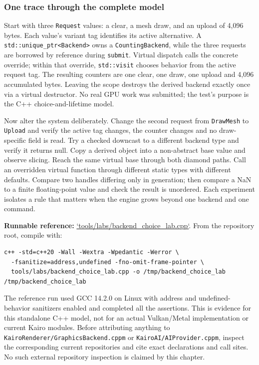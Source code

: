 \subsubsection{One trace through the complete model}\label{one-trace-through-the-complete-model}

Start with three \texttt{Request} values: a clear, a mesh draw, and an upload of 4,096 bytes. Each value's variant tag identifies its active alternative. A \texttt{std::unique\_ptr\textless{}Backend\textgreater{}} owns a \texttt{CountingBackend}, while the three requests are borrowed by reference during \texttt{submit}. Virtual dispatch calls the concrete override; within that override, \texttt{std::visit} chooses behavior from the active request tag. The resulting counters are one clear, one draw, one upload and 4,096 accumulated bytes. Leaving the scope destroys the derived backend exactly once via a virtual destructor. No real GPU work was submitted; the test's purpose is the C++ choice-and-lifetime model.

Now alter the system deliberately. Change the second request from \texttt{DrawMesh} to \texttt{Upload} and verify the active tag changes, the counter changes and no draw-specific field is read. Try a checked downcast to a different backend type and verify it returns null. Copy a derived object into a non-abstract base value and observe slicing. Reach the same virtual base through both diamond paths. Call an overridden virtual function through different static types with different defaults. Compare two handles differing only in generation; then compare a NaN to a finite floating-point value and check the result is unordered. Each experiment isolates a rule that matters when the engine grows beyond one backend and one command.

\textbf{Runnable reference:} \href{tools/labs/backend_choice_lab.cpp}{`tools/labs/backend\_choice\_lab.cpp`}. From the repository root, compile with:

\begin{verbatim}
c++ -std=c++20 -Wall -Wextra -Wpedantic -Werror \
  -fsanitize=address,undefined -fno-omit-frame-pointer \
  tools/labs/backend_choice_lab.cpp -o /tmp/backend_choice_lab
/tmp/backend_choice_lab
\end{verbatim}

The reference run used GCC 14.2.0 on Linux with address and undefined-behavior sanitizers enabled and completed all the assertions. This is evidence for this standalone C++ model, not for an actual Vulkan/Metal implementation or current Kairo modules. Before attributing anything to \texttt{KairoRenderer/GraphicsBackend.cppm} or \texttt{KairoAI/AIProvider.cppm}, inspect the corresponding current repositories and cite exact declarations and call sites. No such external repository inspection is claimed by this chapter.

